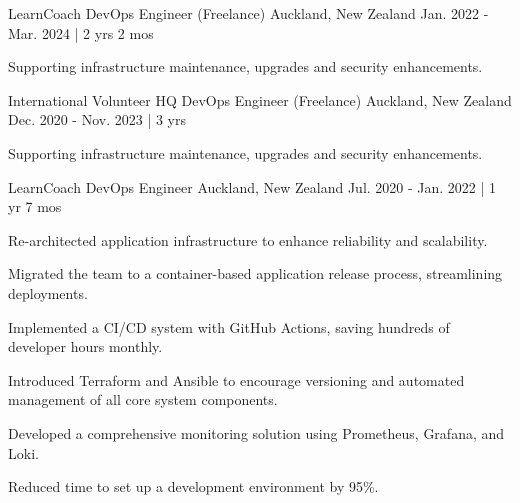 \begin{cventries}

\cventry
{LearnCoach} %
{DevOps Engineer (Freelance)} %
{Auckland, New Zealand} %
{Jan. 2022 - Mar. 2024 | 2 yrs 2 mos} %
{ %
\begin{cvitems}
\item {Supporting infrastructure maintenance, upgrades and security enhancements.}
\end{cvitems}
}


\cventry
{International Volunteer HQ} %
{DevOps Engineer (Freelance)} %
{Auckland, New Zealand} %
{Dec. 2020 - Nov. 2023 | 3 yrs} %
{ %
\begin{cvitems}
\item {Supporting infrastructure maintenance, upgrades and security enhancements.}
\end{cvitems}
}


\cventry
{LearnCoach} %
{DevOps Engineer} %
{Auckland, New Zealand} %
{Jul. 2020 - Jan. 2022 | 1 yr 7 mos} %
{ %
\begin{cvitems}
\item {Re-architected application infrastructure to enhance reliability and scalability.}
\item {Migrated the team to a container-based application release process, streamlining deployments.}
\item {Implemented a CI/CD system with GitHub Actions, saving hundreds of developer hours monthly.}
\item {Introduced Terraform and Ansible to encourage versioning and automated management of all core system components.}
\item {Developed a comprehensive monitoring solution using Prometheus, Grafana, and Loki.}
\item {Reduced time to set up a development environment by 95\%.}
\end{cvitems}
}



\end{cventries}
